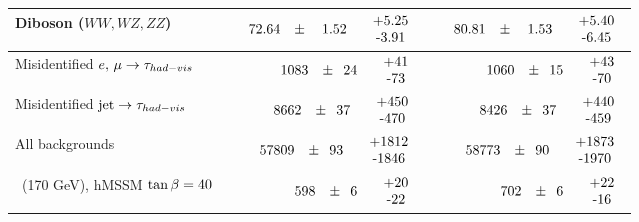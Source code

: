 \begin{table}
\begin{center}
{\begin{tabular}{| l | r | r |}
			Diboson ($WW, WZ, ZZ$) &  $\phantom{000}72.64\phantom{.0}\pm\phantom{00}1.52\phantom{.0}\phantom{0}\begin{tabular}{c}+5.25 \\-3.91\end{tabular}$ & $\phantom{000}80.81\phantom{.0}\pm\phantom{00}1.53\phantom{.0}\phantom{0}\begin{tabular}{c}+5.40 \\-6.45\end{tabular}$ \\ \hline
			Misidentified $e,\,\mu \to \tau_{had-vis}$   &   $\phantom{0}1083\phantom{.0}\pm\phantom{0}24\phantom{.0}\phantom{0}\begin{tabular}{c}+41 \\-73\end{tabular}$ & $\phantom{0}1060\phantom{.0}\pm\phantom{0}15\phantom{.0}\phantom{0}\begin{tabular}{c}+43 \\-70\end{tabular}$ \\ \hline
			Misidentified $\mbox{jet} \to \tau_{had-vis}$ &   $\phantom{0}8662\phantom{.0}\pm\phantom{0}37\phantom{.0}\phantom{0}\begin{tabular}{c}+450 \\-470\end{tabular}$ & $\phantom{0}8426\phantom{.0}\pm\phantom{0}37\phantom{.0}\phantom{0}\begin{tabular}{c}+440 \\-459\end{tabular}$ \\ \hline
			\hline
			All backgrounds   &  $57809\phantom{.0}\pm\phantom{0} 93\phantom{.0}\phantom{0}\begin{tabular}{c}+1812 \\-1846\end{tabular}$ & $58773\phantom{.0}\pm\phantom{0} 90\phantom{.0}\phantom{0}\begin{tabular}{c}+1873 \\-1970\end{tabular}$ \\
			\hline
			\Hpm $\phantom{0}$(170 GeV), hMSSM $\tan\beta=40$ & $\phantom{0}598\phantom{.0}\pm\phantom{0}6\phantom{.0}\phantom{0}\begin{tabular}{c}+20 \\-22\end{tabular}$ & $\phantom{0}702\phantom{.0}\pm\phantom{0}6\phantom{.0}\phantom{0}\begin{tabular}{c}+22 \\-16\end{tabular}$ \\

\end{tabular}}
\end{center}
\end{table}
